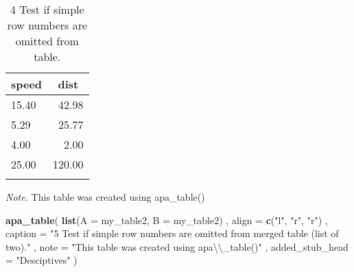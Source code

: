 \documentclass[english,man]{apa6}
\newenvironment{Shaded}{\begin{snugshade}}{\end{snugshade}}
\newcommand{\KeywordTok}[1]{\textcolor[rgb]{0.13,0.29,0.53}{\textbf{{#1}}}}
\newcommand{\DataTypeTok}[1]{\textcolor[rgb]{0.13,0.29,0.53}{{#1}}}
\newcommand{\CharTok}[1]{\textcolor[rgb]{0.31,0.60,0.02}{{#1}}}
\newcommand{\StringTok}[1]{\textcolor[rgb]{0.31,0.60,0.02}{{#1}}}
\newcommand{\NormalTok}[1]{{#1}}
\theoremstyle{definition}
\theoremstyle{definition}
\theoremstyle{definition}
\theoremstyle{remark}
\begin{document}
\begin{table}[tbp]
\begin{center}
\begin{threeparttable}
\caption{\label{tab:unnamed-chunk-4}4 Test if simple row numbers are omitted from table.}
\begin{tabular}{lr}
\toprule
speed & \multicolumn{1}{c}{dist}\\
\midrule
15.40 & 42.98\\
5.29 & 25.77\\
4.00 & 2.00\\
25.00 & 120.00\\
\bottomrule
\addlinespace
\end{tabular}
\begin{tablenotes}[para]
\textit{Note.} This table was created using apa\_table()
\end{tablenotes}
\end{threeparttable}
\end{center}
\end{table}

\begin{Shaded}
\begin{Highlighting}[]
\KeywordTok{apa_table}\NormalTok{(}
  \KeywordTok{list}\NormalTok{(}\DataTypeTok{A =} \NormalTok{my_table2, }\DataTypeTok{B =} \NormalTok{my_table2)}
  \NormalTok{, }\DataTypeTok{align =} \KeywordTok{c}\NormalTok{(}\StringTok{"l"}\NormalTok{, }\StringTok{"r"}\NormalTok{, }\StringTok{"r"}\NormalTok{)}
  \NormalTok{, }\DataTypeTok{caption =} \StringTok{"5 Test if simple row numbers are omitted from merged table (list of two)."}
  \NormalTok{, }\DataTypeTok{note =} \StringTok{"This table was created using apa}\CharTok{\textbackslash{}\textbackslash{}}\StringTok{_table()"}
  \NormalTok{, }\DataTypeTok{added_stub_head =} \StringTok{"Desciptives"}
\NormalTok{)}
\end{Highlighting}
\end{Shaded}
\end{document}
